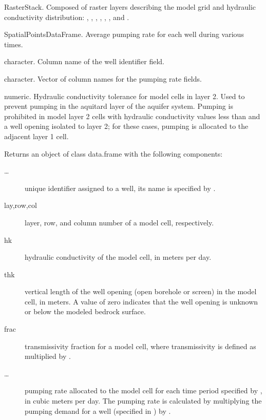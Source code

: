 \documentclass[a4paper]{book}
\begin{document}
%
\begin{Arguments}
\begin{ldescription}
\item[\code{rs.model}] RasterStack.
Composed of raster layers describing the model grid and hydraulic conductivity distribution:
, , , ,
, , and .

\item[\code{wells}] SpatialPointsDataFrame.
Average pumping rate for each well during various times.

\item[\code{well.col}] character.
Column name of the well identifier field.

\item[\code{rate.col}] character.
Vector of column names for the pumping rate fields.

\item[\code{lay2.hk.tol}] numeric.
Hydraulic conductivity tolerance for model cells in layer 2.
Used to prevent pumping in the aquitard layer of the aquifer system.
Pumping is prohibited in model layer 2 cells with hydraulic conductivity values less than
 and a well opening isolated to layer 2;
for these cases, pumping is allocated to the adjacent layer 1 cell.
\end{ldescription}
\end{Arguments}
%
\begin{Value}
Returns an object of class data.frame with the following components:
\begin{description}

\item[\dots] unique identifier assigned to a well, its name is specified by .
\item[lay,row,col] layer, row, and column number of a model cell, respectively.
\item[hk] hydraulic conductivity of the model cell, in meters per day.
\item[thk] vertical length of the well opening (open borehole or screen) in the model cell, in meters.
A value of zero indicates that the well opening is unknown or below the modeled bedrock surface.
\item[frac] transmissivity fraction for a model cell,
where transmissivity is defined as  multiplied by .
\item[\dots] pumping rate allocated to the model cell for each time period
specified by , in cubic meters per day.
The pumping rate is calculated by multiplying the pumping demand for a well
(specified in ) by .

\end{description}

\end{Value}
\end{document}
